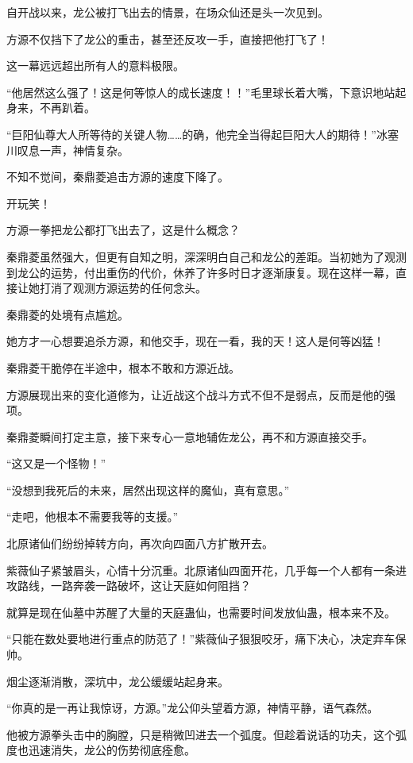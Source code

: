 
\begin{this_body}

自开战以来，龙公被打飞出去的情景，在场众仙还是头一次见到。

方源不仅挡下了龙公的重击，甚至还反攻一手，直接把他打飞了！

这一幕远远超出所有人的意料极限。

“他居然这么强了！这是何等惊人的成长速度！！”毛里球长着大嘴，下意识地站起身来，不再趴着。

“巨阳仙尊大人所等待的关键人物……的确，他完全当得起巨阳大人的期待！”冰塞川叹息一声，神情复杂。

不知不觉间，秦鼎菱追击方源的速度下降了。

开玩笑！

方源一拳把龙公都打飞出去了，这是什么概念？

秦鼎菱虽然强大，但更有自知之明，深深明白自己和龙公的差距。当初她为了观测到龙公的运势，付出重伤的代价，休养了许多时日才逐渐康复。现在这样一幕，直接让她打消了观测方源运势的任何念头。

秦鼎菱的处境有点尴尬。

她方才一心想要追杀方源，和他交手，现在一看，我的天！这人是何等凶猛！

秦鼎菱干脆停在半途中，根本不敢和方源近战。

方源展现出来的变化道修为，让近战这个战斗方式不但不是弱点，反而是他的强项。

秦鼎菱瞬间打定主意，接下来专心一意地辅佐龙公，再不和方源直接交手。

“这又是一个怪物！”

“没想到我死后的未来，居然出现这样的魔仙，真有意思。”

“走吧，他根本不需要我等的支援。”

北原诸仙们纷纷掉转方向，再次向四面八方扩散开去。

紫薇仙子紧皱眉头，心情十分沉重。北原诸仙四面开花，几乎每一个人都有一条进攻路线，一路奔袭一路破坏，这让天庭如何阻挡？

就算是现在仙墓中苏醒了大量的天庭蛊仙，也需要时间发放仙蛊，根本来不及。

“只能在数处要地进行重点的防范了！”紫薇仙子狠狠咬牙，痛下决心，决定弃车保帅。

烟尘逐渐消散，深坑中，龙公缓缓站起身来。

“你真的是一再让我惊讶，方源。”龙公仰头望着方源，神情平静，语气森然。

他被方源拳头击中的胸膛，只是稍微凹进去一个弧度。但趁着说话的功夫，这个弧度也迅速消失，龙公的伤势彻底痊愈。


\end{this_body}
